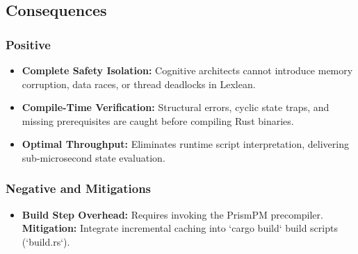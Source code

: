 \subsection{Consequences}
\subsubsection{Positive}
\begin{itemize}
    \item \textbf{Complete Safety Isolation:} Cognitive architects cannot introduce memory corruption, data races, or thread deadlocks in Lexlean.
    \item \textbf{Compile-Time Verification:} Structural errors, cyclic state traps, and missing prerequisites are caught before compiling Rust binaries.
    \item \textbf{Optimal Throughput:} Eliminates runtime script interpretation, delivering sub-microsecond state evaluation.
\end{itemize}

\subsubsection{Negative and Mitigations}
\begin{itemize}
    \item \textbf{Build Step Overhead:} Requires invoking the PrismPM precompiler. \textbf{Mitigation:} Integrate incremental caching into `cargo build` build scripts (`build.rs`).
\end{itemize}
